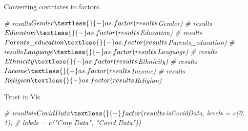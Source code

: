 \documentclass[
]{article}
\newenvironment{Shaded}{\begin{snugshade}}{\end{snugshade}}
\newcommand{\CommentTok}[1]{\textcolor[rgb]{0.56,0.35,0.01}{\textit{#1}}}
\begin{document}
Converting covariates to factors

\begin{Shaded}
\begin{Highlighting}[]
\CommentTok{\# results$Gender \textless{}{-} as.factor(results$Gender)}
\CommentTok{\# results$Education \textless{}{-} as.factor(results$Education)}
\CommentTok{\# results$Parents\_education \textless{}{-} as.factor(results$Parents\_education)}
\CommentTok{\# results$Language \textless{}{-} as.factor(results$Language)}
\CommentTok{\# results$Ethnicity \textless{}{-} as.factor(results$Ethnicity)}
\CommentTok{\# results$Income \textless{}{-} as.factor(results$Income)}
\CommentTok{\# results$Religion \textless{}{-} as.factor(results$Religion)}
\end{Highlighting}
\end{Shaded}

Trust in Vis

\begin{Shaded}
\begin{Highlighting}[]
\CommentTok{\# results$isCovidData \textless{}{-} factor(results$isCovidData, levels = c(0, 1),}
\CommentTok{\#                   labels = c("Crop Data", "Covid Data"))}
\end{Highlighting}
\end{Shaded}
\end{document}
